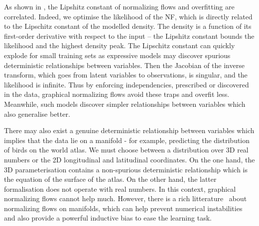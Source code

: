 As shown in , the Lipshitz constant of normalizing flows and overfitting are correlated. Indeed, we optimise the likelihood of the NF, which is directly related to the Lipschitz constant of the modelled density. The density is a function of its first-order derivative with respect to the input -- the Lipshitz constant bounds the likelihood and the highest density peak. The Lipschitz constant can quickly explode for small training sets as expressive models may discover spurious deterministic relationships between variables. Then the Jacobian of the inverse transform, which goes from latent variables to observations, is singular, and the likelihood is infinite. Thus by enforcing independencies, prescribed or discovered in the data, graphical normalizing flows avoid these traps and overfit less. Meanwhile, such models discover simpler relationships between variables which also generalise better.

There may also exist a genuine deterministic relationship between variables which implies that the data lie on a manifold - for example, predicting the distribution of birds on the world atlas. We must choose between a distribution over 3D real numbers or the 2D longitudinal and latitudinal coordinates. On the one hand, the 3D parameterisation contains a non-spurious deterministic relationship which is the equation of the surface of the atlas. On the other hand, the latter formalisation does not operate with real numbers. In this context, graphical normalizing flows cannot help much. However, there is a rich litterature~\citep{kohler2021smooth, mathieu2020riemannian, gemici2016normalizing, kalatzis2021multi, rezende2020normalizing} about normalizing flows on manifolds, which can help prevent numerical instabilities and also provide a powerful inductive bias to ease the learning task.

